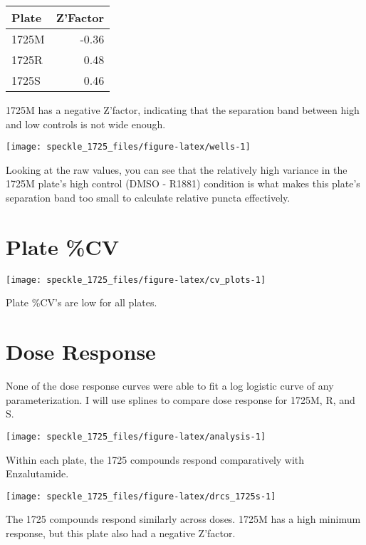 \documentclass[
]{article}
\begin{document}
\begin{longtable}[]{@{}lr@{}}
\toprule\noalign{}
Plate & Z'Factor \\
\midrule\noalign{}
\endhead
\bottomrule\noalign{}
\endlastfoot
1725M & -0.36 \\
1725R & 0.48 \\
1725S & 0.46 \\
\end{longtable}

1725M has a negative Z'factor, indicating that the separation band
between high and low controls is not wide enough.

\begin{center}\texttt{[image: speckle\_1725\_files/figure-latex/wells-1]} \end{center}

Looking at the raw values, you can see that the relatively high variance
in the 1725M plate's high control (DMSO - R1881) condition is what makes
this plate's separation band too small to calculate relative puncta
effectively.

\newpage

\section{Plate \%CV}\label{plate-cv}

\begin{center}\texttt{[image: speckle\_1725\_files/figure-latex/cv\_plots-1]} \end{center}

Plate \%CV's are low for all plates.

\newpage

\section{Dose Response}\label{dose-response}

None of the dose response curves were able to fit a log logistic curve
of any parameterization. I will use splines to compare dose response for
1725M, R, and S.

\begin{center}\texttt{[image: speckle\_1725\_files/figure-latex/analysis-1]} \end{center}

Within each plate, the 1725 compounds respond comparatively with
Enzalutamide.

\begin{center}\texttt{[image: speckle\_1725\_files/figure-latex/drcs\_1725s-1]} \end{center}

The 1725 compounds respond similarly across doses. 1725M has a high
minimum response, but this plate also had a negative Z'factor.
\end{document}
